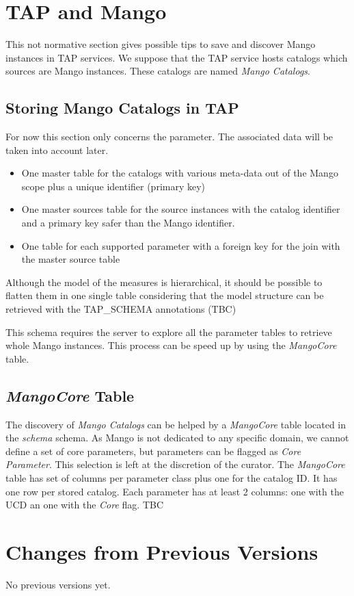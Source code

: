 \documentclass[11pt,a4paper]{ivoa}
\begin{document}


\section{TAP and Mango}
This not normative section gives possible tips to save and discover Mango instances in TAP services.
We suppose that the TAP service hosts catalogs which sources are Mango instances. These catalogs are named \emph{Mango Catalogs}.

\subsection{Storing Mango Catalogs in TAP}
For now this section only concerns the parameter. The associated data will be taken into account later.

\begin{itemize}
  \item One master table for the catalogs with various meta-data out of the Mango scope plus a unique identifier (primary key)
  \item One master sources table for the source instances with the catalog identifier and a primary key safer than the Mango identifier.
  \item One table for each supported parameter with a foreign key for the join with the master source table
\end{itemize}

Although the model of the measures is hierarchical, it should be possible to flatten them in one single table considering that the model structure can be retrieved with the TAP\_SCHEMA annotations (TBC) 

This schema requires the server to explore all the parameter tables to retrieve  whole Mango instances. This process can be speed up by using the \emph{MangoCore} table.

\subsection{ \emph{MangoCore} Table}

The discovery of \emph{Mango Catalogs} can be helped by a  \emph{MangoCore} table located in the  \emph{schema} schema. As Mango is not dedicated to any specific domain, we cannot define a set of core parameters, but parameters can be flagged as \emph{Core Parameter}. This selection is left at the discretion of the curator.
The \emph{MangoCore} table has set of columns per parameter class plus one for the catalog ID. It has one row per stored catalog. Each parameter has at least 2 columns: one with the UCD an one with the \emph{Core} flag. TBC


\appendix
\section{Changes from Previous Versions}

No previous versions yet.  



\end{document}

